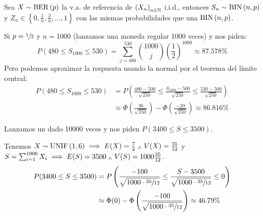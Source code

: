 \begin{ejem}
	Sea $X\sim \operatorname{BER}\left(p\right)$ la v.a. de referencia de $\left(X_n\right)_{n\in \mathbb{N}}$ i.i.d., entonces $S_n \sim \operatorname{BIN}\left(n,p\right)$ y $Z_n \in \left\{0, \frac{1}{n}, \frac{2}{n}, \dots, 1\right\}$ con las mismas probabilidades que una $\operatorname{BIN}\left(n,p\right)$.

	Si $p=\sfrac{1}{2}$ y $n=1000$ (lanzamos una moneda regular 1000 veces) y nos piden:
	\[P(480 \leq S_1000 \leq 530) = \sum_{j=480}^{530} \binom{1000}{j} \left(\frac{1}{2}\right)^{1000} \approx 87.578\%\]
	Pero podemos aproximar la respuesta usando la normal por el teorema del límite central:
	\[\begin{aligned}
			P(480 \leq S_1000 \leq 530) & = P\left(\frac{480-500}{\sqrt{250}} \leq \frac{S_{1000}-500}{\sqrt{250}} \leq \frac{530-500}{\sqrt{250}}\right) \\
			                            & \approx \Phi\left(\frac{30}{\sqrt{250}}\right) - \Phi\left(\frac{-20}{\sqrt{250}}\right) \approx 86.816\%
		\end{aligned}\]
\end{ejem}

\begin{ejem}
	Lanzamos un dado 10000 veces y nos piden $P(3400 \leq S \leq 3500)$.

	Tenemos $X\sim \operatorname{UNIF}\left(1,6\right) \implies E(X) = \frac{7}{2} \; _{\wedge} \; V(X) = \frac{35}{12}$ y $S = \sum_{i=1}^{1000} X_i \implies E(S) = 3500 \; _{\wedge} \; V(S) = 1000\frac{35}{12}$.
	\[\begin{aligned}
			P(3400 \leq S \leq 3500) & = P\left(\frac{-100}{\sqrt{1000 \cdot \sfrac{35}{12}}} \leq \frac{S-3500}{\sqrt{1000\cdot \sfrac{35}{12}}} \leq 0\right) \\
			                         & \approx \Phi(0) - \Phi\left(\frac{-100}{\sqrt{1000\cdot \sfrac{35}{12}}}\right) \approx 46.79\%
		\end{aligned}\]
\end{ejem}

